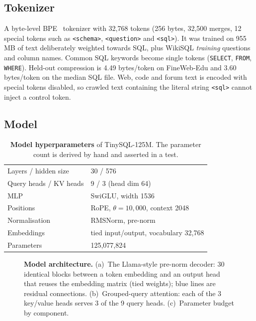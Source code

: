\documentclass[11pt]{article}
\begin{document}
\subsection{Tokenizer}

A byte-level BPE~\cite{sennrich2016bpe} tokenizer with 32,768 tokens (256 bytes, 32,500 merges, 12 special tokens such as \texttt{<schema>}, \texttt{<question>} and \texttt{<sql>}). It was trained on 955\,MB of text deliberately weighted towards SQL, plus WikiSQL \emph{training} questions and column names. Common SQL keywords become single tokens (\texttt{\textvisiblespace SELECT}, \texttt{\textvisiblespace FROM}, \texttt{\textvisiblespace WHERE}). Held-out compression is 4.49 bytes/token on FineWeb-Edu and 3.60 bytes/token on the median SQL file. Web, code and forum text is encoded with special tokens disabled, so crawled text containing the literal string \texttt{<sql>} cannot inject a control token.

\subsection{Model}

\begin{table}[t]
\centering
\small
\begin{tabular}{ll}
\toprule
Layers / hidden size & 30 / 576 \\
Query heads / KV heads & 9 / 3 (head dim 64) \\
MLP & SwiGLU, width 1536 \\
Positions & RoPE, $\theta = 10{,}000$, context 2048 \\
Normalisation & RMSNorm, pre-norm \\
Embeddings & tied input/output, vocabulary 32,768 \\
Parameters & 125,077,824 \\
\bottomrule
\end{tabular}
\caption{\textbf{Model hyperparameters} of TinySQL-125M. The parameter count is derived by hand and asserted in a test.}
\label{tab:arch}
\end{table}

\begin{figure}[!htbp]
\centering
\resizebox{0.97\linewidth}{!}{}
\caption{\textbf{Model architecture.} (a)~The Llama-style pre-norm decoder: 30 identical blocks between a token embedding and an output head that reuses the embedding matrix (tied weights); blue lines are residual connections. (b)~Grouped-query attention: each of the 3 key/value heads serves 3 of the 9 query heads. (c)~Parameter budget by component.}
\label{fig:arch}
\end{figure}
\end{document}
